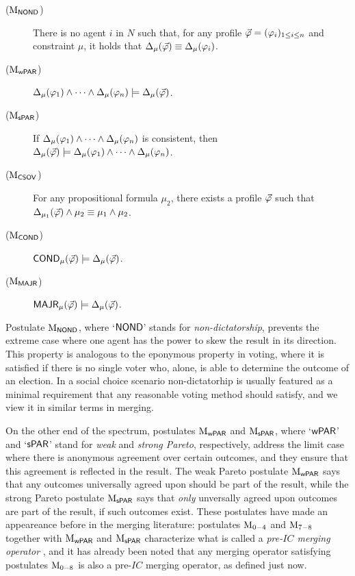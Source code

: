\begin{description}
	\item[($\ppm{\NOND}$)] There is no agent $i$ in $N$ such that,	 
		for any profile $\P=(\phi_i)_{1\le i \le n}$ and constraint $\mu$, 
		it holds that $\me_\mu(\P)\equiv \me_{\mu}(\phi_i)$.
	\item[($\ppm{\WPRT}$)] $\me_{\mu}(\phi_1) \land \dots \land \me_{\mu}(\phi_n) \models \me_{\mu}(\P)$.
	\item[($\ppm{\SPRT}$)] If $\me_{\mu}(\phi_1) \land \dots \land \me_{\mu}(\phi_n)$ is consistent, 
		then $\me_{\mu}(\P)\models\me_{\mu}(\phi_1) \land \dots \land \me_{\mu}(\phi_n)$.
	\item[($\ppm{\CSOV}$)] For any propositional formula $\mu_2$,
		there exists a profile $\P$ such that $\me_{\mu_1}(\P)\land\mu_2 \equiv \mu_1\land\mu_2$.
	\item[($\ppm{\COND}$)] $\COND_\mu(\P)\models\me_\mu(\P)$.
	\item[($\ppm{\MAJR}$)] $\MAJR_\mu(\P)\models\me_\mu(\P)$.
\end{description}

Postulate $\ppm{\NOND}$, where `$\NOND$' stands for \emph{non-dictatorship},
prevents the extreme case where one agent has the power 
to skew the result in its direction.
This property is analogous to the eponymous property in voting,
where it is satisfied if there is no single voter who, alone, is able to 
determine the outcome of an election.
In a social choice scenario non-dictatorhip is usually featured as a 
minimal requirement that any reasonable voting method should satisfy,
and we view it in similar terms in merging.

On the other end of the spectrum,
postulates $\ppm{\WPRT}$ and $\ppm{\SPRT}$,
where `$\WPRT$' and `$\SPRT$' stand for 
\emph{weak} and \emph{strong Pareto}, respectively,
address the limit case where there is anonymous agreement over certain outcomes,
and they ensure that this agreement is reflected in the result.
The weak Pareto postulate $\ppm{\WPRT}$ says that any outcomes universally
agreed upon should be part of the result,
while the strong Pareto postulate $\ppm{\SPRT}$ says that 
\emph{only} unversally agreed upon outcomes are part of the result,
if such outcomes exist.
These postulates have made an appeareance before in the merging literature:
postulates $\ppm{0-4}$ and $\ppm{7-8}$
together with $\ppm{\WPRT}$ and $\ppm{\SPRT}$ characterize 
what is called a \textit{pre-$IC$ merging operator} \cite{EveraereKM14},
and it has already been noted that any merging operator satisfying postulates 
$\ppm{0-8}$ is also a pre-$IC$ merging operator, as defined just now.

